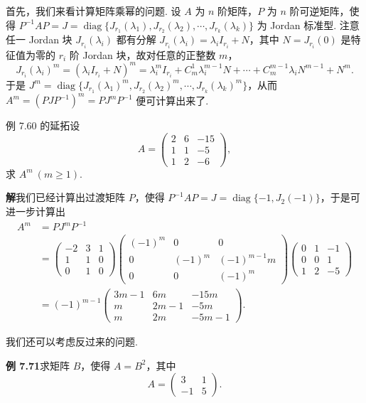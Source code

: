 \documentclass[UTF8, 12pt, fontset=fandol, oneside]{ctexart}
\begin{document}
首先，我们来看计算矩阵乘幂的问题. 设 $A$ 为 $n$ 阶矩阵，$P$ 为 $n$ 阶可逆矩阵，使得 $P^{-1}AP=J=\operatorname{diag}\{J_{r_1}(\lambda_1),J_{r_2}(\lambda_2),\cdots,J_{r_k}(\lambda_k)\}$ 为 Jordan 标准型. 注意任一 Jordan 块 $J_{r_i}(\lambda_i)$ 都有分解 $J_{r_i}(\lambda_i)=\lambda_iI_{r_i}+N$，其中 $N=J_{r_i}(0)$ 是特征值为零的 $r_i$ 阶 Jordan 块，故对任意的正整数 $m$，
\[
J_{r_i}(\lambda_i)^m=(\lambda_iI_{r_i}+N)^m=\lambda_i^mI_{r_i}+C_m^1\lambda_i^{m-1}N+\cdots+C_m^{m-1}\lambda_iN^{m-1}+N^m.
\]
于是 $J^m=\operatorname{diag}\{J_{r_1}(\lambda_1)^m,J_{r_2}(\lambda_2)^m,\cdots,J_{r_k}(\lambda_k)^m\}$，从而 $A^m=(PJP^{-1})^m=PJ^mP^{-1}$ 便可计算出来了.

例 7.60 的延拓\quad 设
\[
A=\left(\begin{array}{rrr}
2&6&-15\\
1&1&-5\\
1&2&-6
\end{array}\right),
\]
求 $A^m\ (m\ge1)$.

\noindent\textbf{解}\quad 我们已经计算出过渡矩阵 $P$，使得 $P^{-1}AP=J=\operatorname{diag}\{-1,J_2(-1)\}$，于是可进一步计算出
\[
\begin{aligned}
A^m&=PJ^mP^{-1}\\
&=\left(\begin{array}{rrr}
-2&3&1\\
1&1&0\\
0&1&0
\end{array}\right)
\left(\begin{array}{ccc}
(-1)^m&0&0\\
0&(-1)^m&(-1)^{m-1}m\\
0&0&(-1)^m
\end{array}\right)
\left(\begin{array}{rrr}
0&1&-1\\
0&0&1\\
1&2&-5
\end{array}\right)\\
&=(-1)^{m-1}\left(\begin{array}{rrr}
3m-1&6m&-15m\\
m&2m-1&-5m\\
m&2m&-5m-1
\end{array}\right).
\end{aligned}
\]

我们还可以考虑反过来的问题.

\noindent\textbf{例 7.71}\quad 求矩阵 $B$，使得 $A=B^2$，其中
\[
A=\left(\begin{array}{rr}
3&1\\
-1&5
\end{array}\right).
\]
\end{document}
